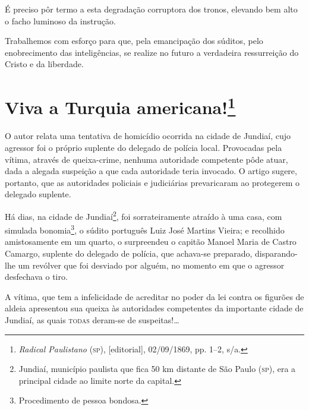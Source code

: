 É preciso pôr termo a esta degradação corruptora dos tronos, elevando
bem alto o facho luminoso da instrução.

Trabalhemos com esforço para que, pela emancipação dos súditos, pelo
enobrecimento das inteligências, se realize no futuro a verdadeira
ressurreição do Cristo e da liberdade.

\chapter{Viva a Turquia americana!\footnote{\emph{Radical Paulistano}
  (\textsc{sp}), {[}editorial{]}, 02/09/1869, pp. 1--2, s/a.}}

\begin{didascalia}
O autor relata uma tentativa de homicídio ocorrida na cidade de Jundiaí,
cujo agressor foi o próprio suplente do delegado de polícia local.
Provocadas pela vítima, através de queixa-crime, nenhuma autoridade
competente pôde atuar, dada a alegada suspeição a que cada autoridade
teria invocado. O artigo sugere, portanto, que as autoridades policiais
e judiciárias prevaricaram ao protegerem o delegado suplente.
\end{didascalia}



Há dias, na cidade de Jundiaí\footnote{Jundiaí, município paulista que
  fica 50 km distante de São Paulo (\textsc{sp}), era a principal cidade ao
  limite norte da capital.}, foi sorrateiramente atraído à uma casa, com
simulada bonomia\footnote{Procedimento de pessoa bondosa.}, o súdito
português Luiz José Martins Vieira; e recolhido amistosamente em um
quarto, o surpreendeu o capitão Manoel Maria de Castro Camargo, suplente
do delegado de polícia, que achava-se preparado, disparando-lhe um
revólver que foi desviado por alguém, no momento em que o agressor
desfechava o tiro.

A vítima, que tem a infelicidade de acreditar no poder da lei contra os
figurões de aldeia apresentou sua queixa às autoridades competentes da
importante cidade de Jundiaí, as quais \textsc{todas} deram-se de suspeitas!\ldots{}

